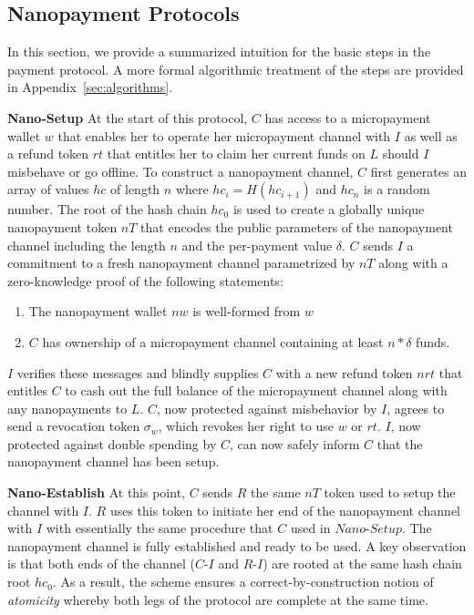 \subsection{Nanopayment Protocols}
In this section, we provide a summarized intuition for the basic steps in the
payment protocol. A more formal algorithmic treatment of the steps are provided
in Appendix~\ref{sec:algorithms}.

\textbf{Nano-Setup} At the start of this protocol, $C$ has access to a
micropayment wallet $w$ that enables her to operate her micropayment channel
with $I$ as well as a refund token $rt$ that entitles her to claim her current
funds on $L$ should $I$ misbehave or go offline. To construct a nanopayment
channel, $C$ first generates an array of values $hc$ of length $n$ where
$hc_i = H(hc_{i+1})$ and $hc_n$ is a random number. The root of the hash chain
$hc_0$ is used to create a globally unique nanopayment token $nT$ that encodes
the public parameters of the nanopayment channel including the length $n$ and
the per-payment value $\delta$. $C$ sends $I$ a commitment to a fresh
nanopayment channel parametrized by $nT$ along with a zero-knowledge proof of
the following statements:

\begin{enumerate}
\item The nanopayment wallet $nw$ is well-formed from $w$
\item $C$ has ownership of a micropayment channel containing at least $n *
  \delta$ funds.
\end{enumerate}

$I$ verifies these messages and blindly supplies $C$ with a new refund token $nrt$
that entitles $C$ to cash out the full balance of the micropayment channel along
with any nanopayments to $L$. $C$, now protected against misbehavior by $I$,
agrees to send a revocation token $\sigma_w$, which revokes her right to use $w$
or $rt$. $I$, now protected against double spending by $C$, can now safely
inform $C$ that the nanopayment channel has been setup.

\textbf{Nano-Establish} At this point, $C$ sends $R$ the same $nT$ token used to
setup the channel with $I$. $R$ uses this token to initiate her end of the
nanopayment channel with $I$ with essentially the same procedure that $C$ used
in $Nano$-$Setup$. The nanopayment channel is fully established and ready to be
used. A key observation is that both ends of the channel ($C$-$I$ and $R$-$I$)
are rooted at the same hash chain root $hc_0$. As a result, the scheme ensures a
correct-by-construction notion of \emph{atomicity} whereby both legs of the
protocol are complete at the same time.

